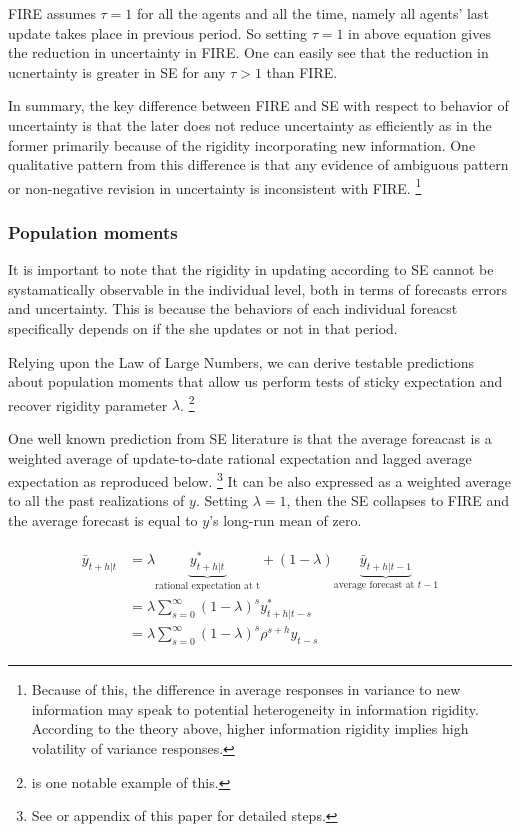 \documentclass[]{article}
\begin{document}
FIRE assumes  $\tau=1$ for all the agents and all the time, namely all agents' last update takes place in previous period. So setting $\tau =1$ in above equation gives the reduction in uncertainty in FIRE. One can easily see that the reduction in ucnertainty is greater in SE for any $\tau>1$ than FIRE.

In summary, the key difference between FIRE and SE with respect to behavior of uncertainty is that the later does not reduce uncertainty  as efficiently as in the former primarily because of the rigidity incorporating new information.  One qualitative pattern from this difference is that any evidence of ambiguous pattern  or non-negative revision in uncertainty is inconsistent with FIRE. \footnote{Because of this, the difference in average responses in variance to new information may speak to potential heterogeneity in information rigidity. According to the theory above, higher information rigidity implies high volatility of variance responses.  }
 


\subsubsection{Population moments} 
	
It is important to note that the rigidity in updating according to SE cannot be systamatically observable in the individual level, both in terms of forecasts errors and uncertainty. This is because the behaviors of each individual foreacst specifically depends on if the she updates or not in that period. 

Relying upon the Law of Large Numbers, we can derive testable predictions about population moments that allow us perform tests of sticky expectation and recover rigidity parameter $\lambda$. \footnote{\citet{carroll2003macroeconomic} is one notable example of this.} 
	

One well known prediction from SE literature is that the average foreacast is a weighted average of update-to-date rational expectation and lagged average expectation as reproduced below. \footnote{See \citet{coibion2012can} or appendix of this paper for detailed steps.} It can be also expressed as a weighted average to all the past realizations of $y$. Setting $\lambda=1$, then the SE collapses to FIRE and the average forecast is equal to $y$'s long-run mean of zero.

\begin{eqnarray}
\begin{aligned}
\bar y_{t+h|t} & = \lambda \underbrace{y^*_{t+h|t}}_{\textrm{rational expectation at t}} + (1-\lambda) \underbrace{\bar y_{t+h|t-1}}_{\textrm{average forecast at } t-1} \\
& = \lambda \sum^{\infty}_{s=0} (1-\lambda)^s y^*_{t+h|t-s} \\
& = \lambda \sum^{\infty}_{s=0} (1-\lambda)^s \rho^{s+h}y_{t-s}
\end{aligned}
\end{eqnarray}
\end{document}
